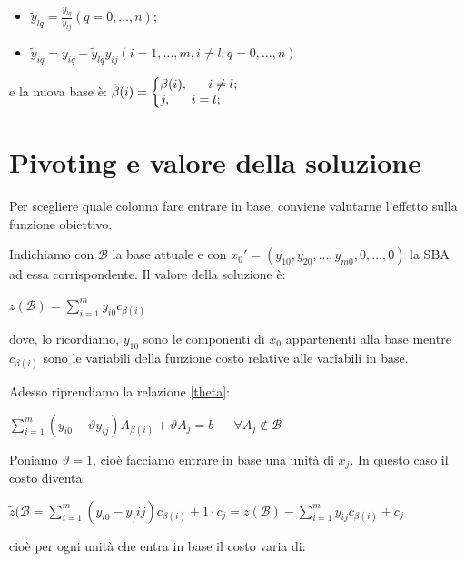 \documentclass[11pt]{book}
\makeatletter
\newenvironment{sistema}%
{\left\lbrace\begin{array}{@{}l@{}}}%
{\end{array}\right.}
\makeatother
\begin{document}
\begin{itemize}
\item $\tilde{y}_{lq} = \frac{y_{lq}}{y_{lj}} (q = 0,\dots,n)$;
\item $\tilde{y}_{iq} = y_{iq} - \tilde{y}_{lq}y_{ij} (i=1,\dots,m,
  i\neq l; q=0,\dots,n)$
\end{itemize}

e la nuova base \`e: $\tilde{\mathcal{\beta}}(i) = 
\begin{sistema}
\beta (i),\phantom{aaa} i\neq l;\\
j,\phantom{aaa} i=l;
\end{sistema}
$

\section{Pivoting e valore della soluzione}

Per scegliere quale colonna fare entrare in base, conviene valutarne
l'effetto sulla funzione obiettivo. 

Indichiamo con $\mathcal{B}$ la base attuale e con $x_0' = (y_{10},
y_{20}, \dots, y_{m0}, 0, \dots, 0)$ la SBA ad essa corrispondente. Il
valore della soluzione \`e:

\begin{center}
$z(\mathcal{B}) = \sum_{i=1}^m y_{i0}c_{\beta(i)}$ 
\end{center}

dove, lo ricordiamo, $y_{10}$ sono le componenti di $x_0$ appartenenti
alla base mentre $c_{\beta(i)}$ sono le variabili della funzione costo
relative alle variabili in base.

Adesso riprendiamo la relazione \ref{theta}:

\begin{center}
$\sum\limits_{i=1}^m (y_{i0} - \vartheta y_{ij}) A_{\beta(i)} +
  \vartheta A_j = b\phantom{aaa}\forall A_j \not\in \mathcal{B} $
\end{center}

Poniamo $\vartheta=1$, cio\`e facciamo entrare in base una unit\`a di
$x_j$. In questo caso il costo diventa:

\begin{center}
$\tilde{z}(\mathcal{B} =
\sum\limits_{i=1}^m(y_{i0}-y_){ij})c_{\beta(i)} + 1 \cdot c_j =
z(\mathcal{B}) - \sum\limits_{i=1}^m y_{ij} c_{\beta(i)} + c_j$
\end{center}

cio\`e per ogni unit\`a che entra in base il costo varia di:
\end{document}
